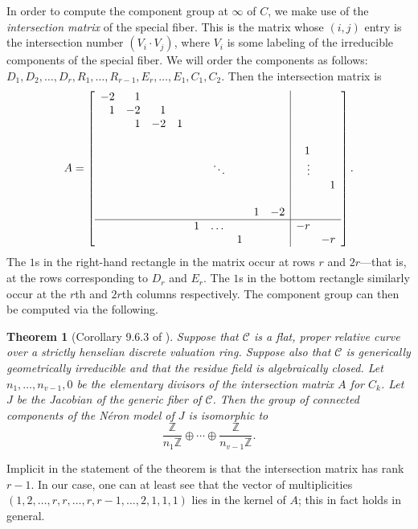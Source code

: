 \documentclass{article}
\newcommand{\scd}{\mathscr{C}}
\theoremstyle{plain}
\newtheorem{theorem}{Theorem}[section]
\theoremstyle{definition}
\theoremstyle{remark}
\newcommand{\Z}{\ensuremath{\mathbb{Z}}}
\begin{document}
In order to compute the component group at $\infty$ of $C$, we make use of the \emph{intersection matrix} of the special fiber. This is the matrix whose $(i,j)$ entry is the intersection number $(V_i \cdot V_j)$, where $V_i$ is some labeling of the irreducible components of the special fiber. We will order the components as follows: $D_1, D_2, \dots, D_r, R_1, \dots, R_{r-1}, E_r, \dots, E_1, C_1, C_2$. Then the intersection matrix is
\[
A = \left[\begin{array}{rrrrrrrrr|rr}
  -2 & 1 & & & & & & & & & \\
  1 & -2 & 1 & & & & & & & & \\
  & 1 & -2 & 1 & & & & & & & \\
  & & & & & & & & & & \\
  & & & & & & & & & 1 & \\
  & & & & & \ddots & & & & \vdots & \\
  & & & & & & & & & & 1 \\
  & & & & & & & & & & \\
  & & & & & & & 1 & -2 & & \\ \hline
  & & & & 1 & \dots & & & & -r & \\
  & & & & & & 1 & & & & -r
\end{array}\right].
\]
The $1$s in the right-hand rectangle in the matrix occur at rows $r$ and $2r$---that is, at the rows corresponding to $D_r$ and $E_r$. The $1$s in the bottom rectangle similarly occur at the $r$th and $2r$th columns respectively. The component group can then be computed via the following.
\begin{theorem}[Corollary 9.6.3 of \cite{blr}]\label{thm:elementary-divisors-comp-group}
  Suppose that $\scd$ is a flat, proper relative curve over a strictly henselian discrete valuation ring. Suppose also that $\scd$ is generically geometrically irreducible and that the residue field is algebraically closed. Let $n_1, \dots, n_{v-1}, 0$ be the elementary divisors of the intersection matrix $A$ for $C_k$. Let $J$ be the Jacobian of the generic fiber of $\scd$. Then the group of connected components of the N\'eron model of $J$ is isomorphic to
  \[
  \frac{\Z}{n_1\Z} \oplus \cdots \oplus \frac{\Z}{n_{v-1}\Z}.
  \]
\end{theorem}
Implicit in the statement of the theorem is that the intersection matrix has rank $r-1$. In our case, one can at least see that the vector of multiplicities $(1,2,\dots,r,r,\dots,r,r-1,\dots,2,1,1,1)$ lies in the kernel of $A$; this in fact holds in general.
\end{document}
